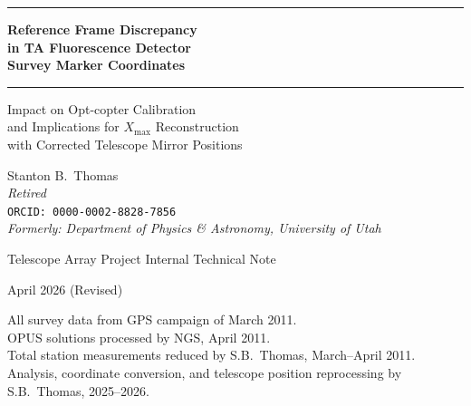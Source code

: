 \documentclass[11pt,letterpaper]{article}
\newcommand{\Xmax}{X_{\text{max}}}
\begin{document}
\begin{titlepage}
\centering
\vspace*{2cm}

{\color{TAblue}\rule{\textwidth}{2pt}}
\vspace{0.5cm}

{\Huge\bfseries\color{TAblue} Reference Frame Discrepancy\\[0.3cm]
in TA Fluorescence Detector\\[0.3cm]
Survey Marker Coordinates}

\vspace{0.5cm}
{\color{TAblue}\rule{\textwidth}{2pt}}

\vspace{1.5cm}

{\Large\color{TAgray} Impact on Opt-copter Calibration\\[0.2cm]
and Implications for $\Xmax$ Reconstruction\\[0.2cm]
with Corrected Telescope Mirror Positions}

\vspace{2cm}

{\large
Stanton B.\ Thomas\\[0.3cm]
\textit{Retired}\\[0.1cm]
\texttt{ORCID: 0000-0002-8828-7856}\\[0.1cm]
\textit{Formerly: Department of Physics \& Astronomy, University of Utah}
}

\vspace{2cm}

{\large\color{TAgray} Telescope Array Project Internal Technical Note}

\vspace{0.5cm}

{\large April 2026 (Revised)}

\vfill

{\small\color{TAgray}
All survey data from GPS campaign of March 2011.\\
OPUS solutions processed by NGS, April 2011.\\
Total station measurements reduced by S.B.\ Thomas, March--April 2011.\\
Analysis, coordinate conversion, and telescope position reprocessing by S.B.\ Thomas, 2025--2026.}

\end{titlepage}

\tableofcontents
\newpage

\end{document}
